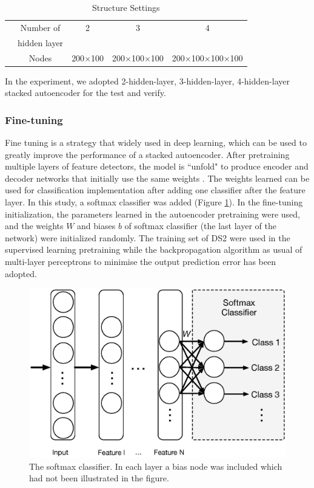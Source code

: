 \documentclass[journal]{IEEEtran}
\begin{document}
     
     \begin{table}[!htbp]
\begin{center}
\begin{threeparttable}
\caption{Structure Settings}
\label{Table 5}
\begin{tabular}{ccccc}
\hline
&Number of & 2 & 3 &  4\\
&hidden layer& & &\\
\hline
& Nodes & 200$\times$100 & 200$\times$100$\times$100&200$\times$100$\times$100$\times$100 \\

\hline
\end{tabular}
\end{threeparttable}
\end{center}
\end{table}


In the experiment, we adopted 2-hidden-layer, 3-hidden-layer, 4-hidden-layer stacked autoencoder for the test and verify. 

\subsubsection{Fine-tuning}
Fine tuning is a strategy that widely used in deep learning, which can be used to greatly improve the performance of a stacked autoencoder. 
After pretraining multiple layers of feature detectors, the model is ``unfold" to produce encoder and decoder networks that initially use the same weights \cite{hinton}. 
The weights learned can be used for classification implementation after adding one classifier after the feature layer. In this study, a softmax classifier was added (Figure \ref{figure3}). 
In the fine-tuning initialization, the parameters learned in the autoencoder pretraining were used, and the weights $W$ and biases $b$  of softmax classifier (the last layer of the network) were initialized randomly. 
The training set of DS2 were used in the supervised learning pretraining while the backpropagation algorithm as usual of multi-layer perceptrons to minimise the output prediction error has been adopted.

\begin{figure}[]
\centering
\includegraphics[width=3 in]{Figure3}
\caption{The softmax classifier. In each layer a bias node was included which had not been illustrated in the figure. }
\label{figure3}
\end{figure}
\end{document}
